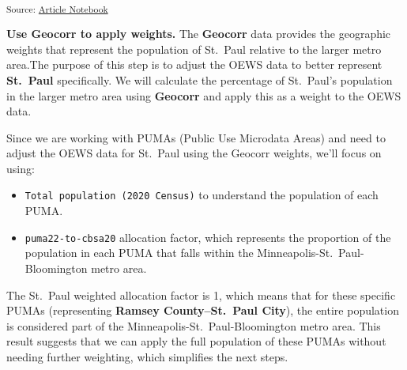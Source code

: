 \documentclass[
  letterpaper,
  DIV=11,
  numbers=noendperiod]{scrartcl}
\begin{document}
\textsubscript{Source:
\href{https://beeckcenter.github.io/climate-equity-workforce/index-preview.html}{Article
Notebook}}

\textbf{Use Geocorr to apply weights.} The \textbf{Geocorr} data
provides the geographic weights that represent the population of
St.~Paul relative to the larger metro area.The purpose of this step is
to adjust the OEWS data to better represent \textbf{St.~Paul}
specifically. We will calculate the percentage of St.~Paul's population
in the larger metro area using \textbf{Geocorr} and apply this as a
weight to the OEWS data.

Since we are working with PUMAs (Public Use Microdata Areas) and need to
adjust the OEWS data for St.~Paul using the Geocorr weights, we'll focus
on using:

\begin{itemize}
\item
  \texttt{Total\ population\ (2020\ Census)} to understand the
  population of each PUMA.
\item
  \texttt{puma22-to-cbsa20} allocation factor, which represents the
  proportion of the population in each PUMA that falls within the
  Minneapolis-St.~Paul-Bloomington metro area.
\end{itemize}

The St.~Paul weighted allocation factor is 1, which means that for these
specific PUMAs (representing \textbf{Ramsey County--St.~Paul City}), the
entire population is considered part of the
Minneapolis-St.~Paul-Bloomington metro area. This result suggests that
we can apply the full population of these PUMAs without needing further
weighting, which simplifies the next steps.
\end{document}
